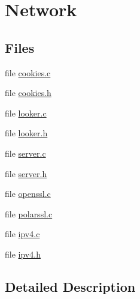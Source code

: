 \hypertarget{group__network}{\section{Network}
\label{group__network}
}
\subsection*{Files}
\begin{DoxyCompactItemize}
\item 
file \hyperlink{cookies_8c}{cookies.\-c}
\item 
file \hyperlink{cookies_8h}{cookies.\-h}
\item 
file \hyperlink{looker_8c}{looker.\-c}
\item 
file \hyperlink{looker_8h}{looker.\-h}
\item 
file \hyperlink{server_8c}{server.\-c}
\item 
file \hyperlink{server_8h}{server.\-h}
\item 
file \hyperlink{openssl_8c}{openssl.\-c}
\item 
file \hyperlink{polarssl_8c}{polarssl.\-c}
\item 
file \hyperlink{ipv4_8c}{ipv4.\-c}
\item 
file \hyperlink{ipv4_8h}{ipv4.\-h}
\end{DoxyCompactItemize}


\subsection{Detailed Description}
